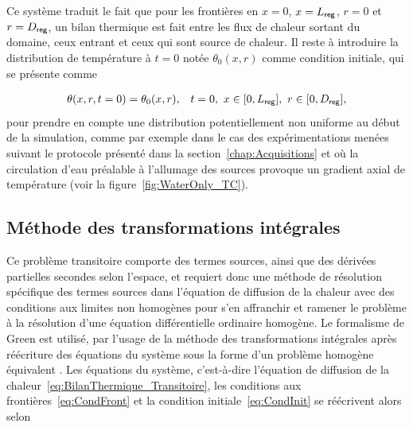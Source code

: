 
Ce système traduit le fait que pour les frontières en $x=0$, $x=L_{\sf reg}$, $r=0$ et $r=D_{\sf reg}$, un bilan thermique est fait entre les flux de chaleur sortant du domaine, ceux entrant et ceux qui sont source de chaleur. Il reste à introduire la distribution de température à $t=0$ notée $\theta_0(x,r)$ comme condition initiale, qui se présente comme

\begin{align}
	\theta(x,r,t=0) &= \theta_0(x,r), & t=0,\ x \in [0,L_{\sf reg}],\ r \in [0,D_{\sf reg}], \label{eq:CondInit}
\end{align}
pour prendre en compte une distribution potentiellement non uniforme au début de la simulation, comme par exemple dans le cas des expérimentations menées suivant le protocole présenté dans la section~\ref{chap:Acquisitions} et où la circulation d'eau préalable à l'allumage des sources provoque un gradient axial de température (voir la figure~\ref{fig:WaterOnly_TC}).

%


\subsection{Méthode des transformations intégrales}\label{chap:TransfoIntegrales}
Ce problème transitoire comporte des termes sources, ainsi que des dérivées partielles secondes selon l'espace, et requiert donc une méthode de résolution spécifique des termes sources dans l'équation de diffusion de la chaleur avec des conditions aux limites non homogènes pour s'en affranchir et ramener le problème à la résolution d'une équation différentielle ordinaire homogène. Le formalisme de Green est utilisé, par l'usage de la méthode des transformations intégrales après réécriture des équations du système sous la forme d'un problème homogène équivalent \cite{hahn_heat_2012}. Les équations du système, c'est-à-dire l'équation de diffusion de la chaleur~\eqref{eq:BilanThermique_Transitoire}, les conditions aux frontières~\eqref{eq:CondFront} et la condition initiale~\eqref{eq:CondInit} se réécrivent alors selon

